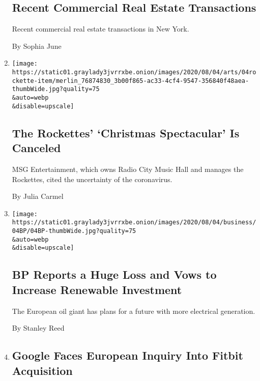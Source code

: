 \begin{enumerate}
{  \subsection{Recent Commercial Real Estate
  Transactions}\label{recent-commercial-real-estate-transactions}}

  Recent commercial real estate transactions in New York.

  By Sophia June
\item
  \href{/2020/08/04/theater/radio-city-rockettes-christmas-canceled.html}{}

  \texttt{[image: https://static01.graylady3jvrrxbe.onion/images/2020/08/04/arts/04rockette-item/merlin\_76874830\_3b00f865-ac33-4cf4-9547-356840f48aea-thumbWide.jpg?quality=75\\\&auto=webp\\\&disable=upscale]}

  \hypertarget{the-rockettes-christmas-spectacular-is-canceled}{%
  \subsection{The Rockettes' `Christmas Spectacular' Is
  Canceled}\label{the-rockettes-christmas-spectacular-is-canceled}}

  MSG Entertainment, which owns Radio City Music Hall and manages the
  Rockettes, cited the uncertainty of the coronavirus.

  By Julia Carmel
\item
  \href{/2020/08/04/business/energy-environment/bp-renewable-investment.html}{}

  \texttt{[image: https://static01.graylady3jvrrxbe.onion/images/2020/08/04/business/04BP/04BP-thumbWide.jpg?quality=75\\\&auto=webp\\\&disable=upscale]}

  \hypertarget{bp-reports-a-huge-loss-and-vows-to-increase-renewable-investment}{%
  \subsection{BP Reports a Huge Loss and Vows to Increase Renewable
  Investment}\label{bp-reports-a-huge-loss-and-vows-to-increase-renewable-investment}}

  The European oil giant has plans for a future with more electrical
  generation.

  By Stanley Reed
\item
  \href{/2020/08/04/business/google-fitbit-europe.html}{}

  \hypertarget{google-faces-european-inquiry-into-fitbit-acquisition}{%
  \subsection{Google Faces European Inquiry Into Fitbit
  Acquisition}\label{google-faces-european-inquiry-into-fitbit-acquisition}}


\end{enumerate}
